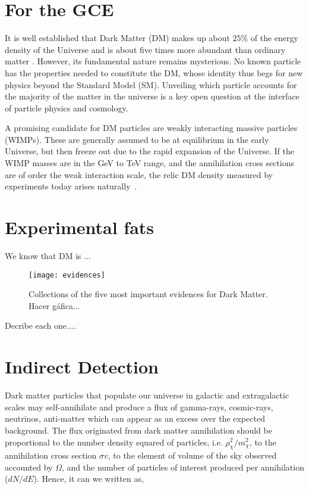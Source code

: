 
\section*{For the GCE}
It is well established that Dark Matter (DM) makes up about $25\%$ of the energy density of the Universe and is about five times more abundant than ordinary matter \cite{hinshaw2012}.
  However, its fundamental nature remains mysterious.
 No known particle has the properties needed to constitute the DM, whose identity thus begs for new physics beyond the Standard Model (SM).
 Unveiling which particle accounts for the majority of the matter in the universe is a key open question at the interface of particle physics and cosmology.

A promising candidate for DM particles are weakly interacting massive particles (WIMPs).
 These are generally assumed to be at equilibrium in the early Universe, but then freeze out due to the rapid expansion of the Universe.
 If the WIMP masses are in the GeV to TeV range, and the annihilation cross sections are of order the weak interaction scale, the relic DM density measured by experiments today arises naturally~\cite{Funk:review}.
 

\section{Experimental fats}
We know that DM is ...


\begin{figure}
\centering
\texttt{[image: evidences]}
\label{fig:evidences}
\caption{Collections of the five most important evidences for Dark Matter. Hacer gáfica...}
\end{figure}

Decribe each one....

\section{Indirect Detection}



Dark matter particles that populate our universe in galactic and extragalactic scales may self-annihilate and produce a flux of gamma-rays, cosmic-rays, neutrinos, anti-matter which can appear as an excess over the expected background. The flux originated from dark matter annihilation should be proportional to the number density squared of particles, i.e. $\rho_{\chi}^2/m_{\chi}^2$, to the annihilation cross section $\sigma v$, to the element of volume of the sky observed accounted by $\Omega$, and the number of particles of interest produced per annihilation ($dN/dE$). Hence, it can we written as,

